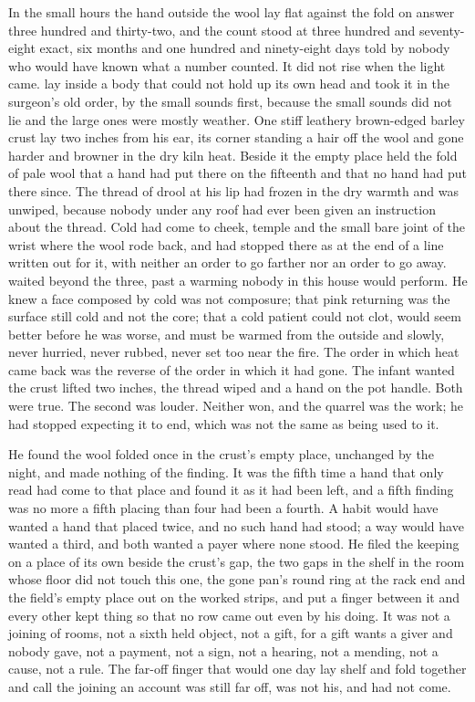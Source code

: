 
In the small hours the hand outside the wool lay flat against the fold on answer three hundred and thirty-two, and the count stood at three hundred and seventy-eight exact, six months and one hundred and ninety-eight days told by nobody who would have known what a number counted. It did not rise when the light came.  lay inside a body that could not hold up its own head and took it in the surgeon's old order, by the small sounds first, because the small sounds did not lie and the large ones were mostly weather. One stiff leathery brown-edged barley crust lay two inches from his ear, its corner standing a hair off the wool and gone harder and browner in the dry kiln heat. Beside it the empty place held the fold of pale wool that a hand had put there on the fifteenth and that no hand had put there since. The thread of drool at his lip had frozen in the dry warmth and was unwiped, because nobody under any roof had ever been given an instruction about the thread. Cold had come to cheek, temple and the small bare joint of the wrist where the wool rode back, and had stopped there as at the end of a line written out for it, with neither an order to go farther nor an order to go away.  waited beyond the three, past a warming nobody in this house would perform. He knew a face composed by cold was not composure; that pink returning was the surface still cold and not the core; that a cold patient could not clot, would seem better before he was worse, and must be warmed from the outside and slowly, never hurried, never rubbed, never set too near the fire. The order in which heat came back was the reverse of the order in which it had gone. The infant wanted the crust lifted two inches, the thread wiped and a hand on the pot handle. Both were true. The second was louder. Neither won, and the quarrel was the work; he had stopped expecting it to end, which was not the same as being used to it.

He found the wool folded once in the crust's empty place, unchanged by the night, and made nothing of the finding. It was the fifth time a hand that only read had come to that place and found it as it had been left, and a fifth finding was no more a fifth placing than four had been a fourth. A habit would have wanted a hand that placed twice, and no such hand had stood; a way would have wanted a third, and both wanted a payer where none stood. He filed the keeping on a place of its own beside the crust's gap, the two gaps in the shelf in the room whose floor did not touch this one, the gone pan's round ring at the rack end and the field's empty place out on the worked strips, and put a finger between it and every other kept thing so that no row came out even by his doing. It was not a joining of rooms, not a sixth held object, not a gift, for a gift wants a giver and nobody gave, not a payment, not a sign, not a hearing, not a mending, not a cause, not a rule. The far-off finger that would one day lay shelf and fold together and call the joining an account was still far off, was not his, and had not come.

